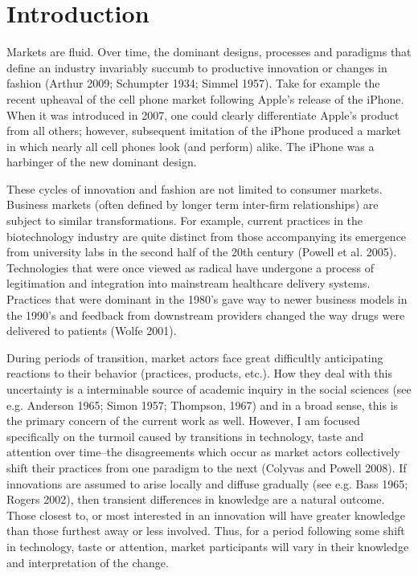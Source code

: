 \chapter{Introduction\label{intro}}

Markets are fluid. Over time, the dominant designs, processes and paradigms that define an industry invariably succumb to productive innovation or changes in fashion (Arthur 2009; Schumpter 1934; Simmel 1957). Take for example the recent upheaval of the cell phone market following Apple's release of the iPhone. When it was introduced in 2007, one could clearly differentiate Apple's product from all others; however, subsequent imitation of the iPhone produced a market in which nearly all cell phones look (and perform) alike. The iPhone was a harbinger of the new dominant design.

These cycles of innovation and fashion are not limited to consumer markets. Business markets (often defined by longer term inter-firm relationships) are subject to similar transformations. For example, current practices in the biotechnology industry are quite distinct from those accompanying its emergence from university labs in the second half of the 20th century (Powell et al. 2005). Technologies that were once viewed as radical have undergone a process of legitimation and integration into mainstream healthcare delivery systems. Practices that were dominant in the 1980's gave way to newer business models in the 1990's and feedback from downstream providers changed the way drugs were delivered to patients (Wolfe 2001). 

During periods of transition, market actors face great difficultly anticipating reactions to their behavior (practices, products, etc.). How they deal with this uncertainty is a interminable source of academic inquiry in the social sciences (see e.g. Anderson 1965; Simon 1957; Thompson, 1967) and in a broad sense, this is the primary concern of the current work as well. However, I am focused specifically on the turmoil caused by transitions in technology, taste and attention over time--the disagreements which occur as market actors collectively shift their practices from one paradigm to the next (Colyvas and Powell 2008). If innovations are assumed to arise locally and diffuse gradually (see e.g. Bass 1965; Rogers 2002), then transient differences in knowledge are a natural outcome. Those closest to, or most interested in an innovation will have greater knowledge than those furthest away or less involved. Thus, for a period following some shift in technology, taste or attention, market participants will vary in their knowledge and interpretation of the change.

